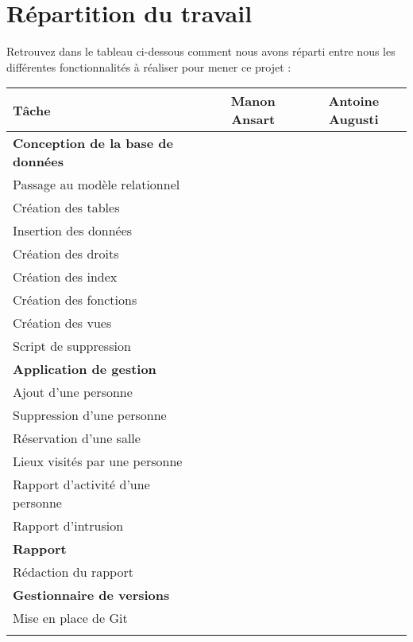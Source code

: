 \section{Répartition du travail}
Retrouvez dans le tableau ci-dessous comment nous avons réparti entre nous les différentes fonctionnalités à réaliser pour mener ce projet : 
\begin{center}
	\begin{tabular}
	{| l ||	c |	c |} \hline
		Tâche & Manon Ansart & Antoine Augusti \\ \hline \hline
		\textbf{Conception de la base de données} & & \\ \hline
		Passage au modèle relationnel & \checkmark & \checkmark \\ \hline
		Création des tables & & \checkmark \\ \hline
		Insertion des données & \checkmark &  \\ \hline
		Création des droits & \checkmark &  \\ \hline
		Création des index & & \checkmark \\ \hline
		Création des fonctions & \checkmark &  \\ \hline
		Création des vues & & \checkmark \\ \hline
		Script de suppression & \checkmark &  \\ \hline
		\hlineGras 
		\textbf{Application de gestion} & & \\ \hline
		Ajout d'une personne & \checkmark &  \\ \hline
		Suppression d'une personne & \checkmark &  \\ \hline
		Réservation d'une salle & & \checkmark \\ \hline
		Lieux visités par une personne & \checkmark &  \\ \hline
		Rapport d'activité d'une personne & & \checkmark \\ \hline
		Rapport d'intrusion & & \checkmark \\ \hline
		\hlineGras 
		\textbf{Rapport} & & \\ \hline
		Rédaction du rapport & \checkmark & \checkmark \\ \hline
		\hlineGras 
		\textbf{Gestionnaire de versions} & & \\ \hline
		Mise en place de Git &  & \checkmark \\ \hline
		\hlineGras 
	\end{tabular}
\end{center}